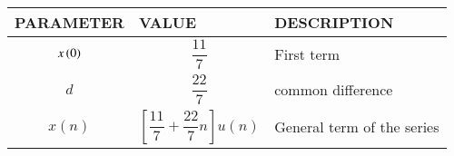 \footnotesize
\begin{tabular}{|p{2cm}|p{2.5cm}|p{2.3cm}|}
    \hline
    PARAMETER & VALUE & DESCRIPTION  \\ \hline
    $$x\left(0\right)$$ & $$\frac{11}{7}$$ & First term \\ \hline
    $$d$$ & $$\frac{22}{7}$$ & common difference \\ \hline
    $$x(n)$$ & $$[\frac{11}{7}+\frac{22}{7} n]u(n)$$ & General term of the series  \\ \hline
  \end{tabular}

